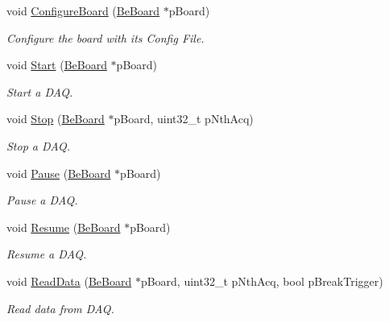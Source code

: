 \begin{DoxyCompactItemize}
void \hyperlink{class_ph2___hw_interface_1_1_be_board_interface_a808eabcbd850dd651f9b3122f702079f}{Configure\-Board} (\hyperlink{class_ph2___hw_description_1_1_be_board}{Be\-Board} $\ast$p\-Board)
\begin{DoxyCompactList}\small\item\em Configure the board with its Config File. \end{DoxyCompactList}\item 
void \hyperlink{class_ph2___hw_interface_1_1_be_board_interface_ac78a16fd4779f86c1224b09d30349e18}{Start} (\hyperlink{class_ph2___hw_description_1_1_be_board}{Be\-Board} $\ast$p\-Board)
\begin{DoxyCompactList}\small\item\em Start a D\-A\-Q. \end{DoxyCompactList}\item 
void \hyperlink{class_ph2___hw_interface_1_1_be_board_interface_a08d0374efe31d8078f8d31f58b709e6f}{Stop} (\hyperlink{class_ph2___hw_description_1_1_be_board}{Be\-Board} $\ast$p\-Board, uint32\-\_\-t p\-Nth\-Acq)
\begin{DoxyCompactList}\small\item\em Stop a D\-A\-Q. \end{DoxyCompactList}\item 
void \hyperlink{class_ph2___hw_interface_1_1_be_board_interface_a2b9692f018d7756fbfd720224da542da}{Pause} (\hyperlink{class_ph2___hw_description_1_1_be_board}{Be\-Board} $\ast$p\-Board)
\begin{DoxyCompactList}\small\item\em Pause a D\-A\-Q. \end{DoxyCompactList}\item 
void \hyperlink{class_ph2___hw_interface_1_1_be_board_interface_ad21d2651379571889a7a2ebc55ee3223}{Resume} (\hyperlink{class_ph2___hw_description_1_1_be_board}{Be\-Board} $\ast$p\-Board)
\begin{DoxyCompactList}\small\item\em Resume a D\-A\-Q. \end{DoxyCompactList}\item 
void \hyperlink{class_ph2___hw_interface_1_1_be_board_interface_a3e5106285fa795c21cb9d20fbf753759}{Read\-Data} (\hyperlink{class_ph2___hw_description_1_1_be_board}{Be\-Board} $\ast$p\-Board, uint32\-\_\-t p\-Nth\-Acq, bool p\-Break\-Trigger)
\begin{DoxyCompactList}\small\item\em Read data from D\-A\-Q. \end{DoxyCompactList}\item 

\end{DoxyCompactItemize}
